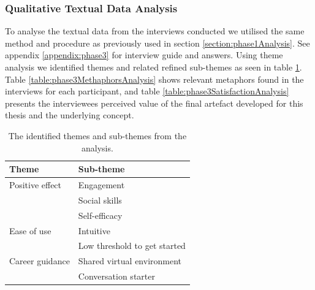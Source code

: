 \subsubsection{Qualitative Textual Data Analysis}
To analyse the textual data from the interviews conducted we utilised the same method and procedure as previously used in section \ref{section:phase1Analysis}. See appendix \ref{appendix:phase3} for interview guide and answers. Using theme analysis we identified themes and  related refined sub-themes as seen in table \ref{table:phase3ThemeAnalysis}. Table \ref{table:phase3MethaphorsAnalysis} shows relevant metaphors found in the interviews for each participant, and table \ref{table:phase3SatisfactionAnalysis} presents the interviewees perceived value of the final artefact developed for this thesis and the underlying concept.


\begin{table}[H]
      \centering
        \begin{tabular}{ll}
        \toprule
        Theme & Sub-theme \\
        \midrule
       Positive effect & Engagement\\
        & Social skills \\\vspace{0.2cm}
        & Self-efficacy \\
        Ease of use & Intuitive\\\vspace{0.2cm}
        & Low threshold to get started \\
        Career guidance & Shared virtual environment\\\vspace{0.2cm}
        & Conversation starter \\
        \bottomrule
        \end{tabular}
        \caption{The identified themes and sub-themes from the analysis.}
        \label{table:phase3ThemeAnalysis}
\end{table}






